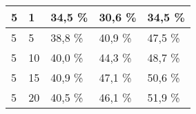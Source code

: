 \begin{table}[!htb]
\begin{tabular}{lllll}
\multicolumn{1}{|l|}{5}                                                      & \multicolumn{1}{l|}{1}                                                                                                        & \multicolumn{1}{l|}{34,5 \%}                                                                                          & \multicolumn{1}{l|}{30,6 \%}                                                                                           & \multicolumn{1}{l|}{34,5 \%}                                                                                           \\ \hline
\multicolumn{1}{|l|}{5}                                                      & \multicolumn{1}{l|}{5}                                                                                                        & \multicolumn{1}{l|}{38,8 \%}                                                                                          & \multicolumn{1}{l|}{40,9 \%}                                                                                           & \multicolumn{1}{l|}{47,5 \%}                                                                                           \\ \hline
\multicolumn{1}{|l|}{5}                                                      & \multicolumn{1}{l|}{10}                                                                                                       & \multicolumn{1}{l|}{40,0 \%}                                                                                          & \multicolumn{1}{l|}{44,3 \%}                                                                                           & \multicolumn{1}{l|}{48,7 \%}                                                                                           \\ \hline
\multicolumn{1}{|l|}{5}                                                      & \multicolumn{1}{l|}{15}                                                                                                       & \multicolumn{1}{l|}{40,9 \%}                                                                                          & \multicolumn{1}{l|}{47,1 \%}                                                                                           & \multicolumn{1}{l|}{50,6 \%}                                                                                           \\ \hline
\multicolumn{1}{|l|}{5}                                                      & \multicolumn{1}{l|}{20}                                                                                                       & \multicolumn{1}{l|}{40,5 \%}                                                                                          & \multicolumn{1}{l|}{46,1 \%}                                                                                           & \multicolumn{1}{l|}{51,9 \%}                                                                                           \\ \hline

\end{tabular}
\end{table}
